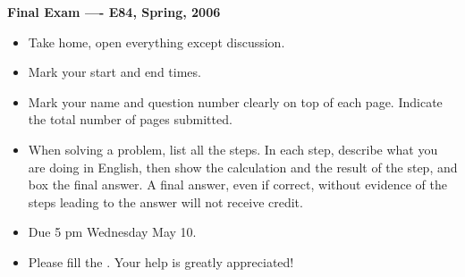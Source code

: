 \usepackage{html}

\begin{center}
{\Large \bf  Final Exam ---- E84, Spring, 2006}
\end{center}

\begin{itemize}
\item Take home, open everything except discussion.
\item Mark your start and end times. %
\item Mark your name and question number clearly on top of each page.
	Indicate the total number of pages submitted.
\item When solving a problem, list all the steps. In each step, describe 
	what you are doing in English, then show the calculation and the 
	result of the step, and box the final answer. A final answer, 
	even if correct, without evidence of the steps leading to the 
	answer will not receive credit.
\item Due 5 pm Wednesday May 10.
\item Please fill the . 
  Your help is greatly appreciated!
\end{itemize}

